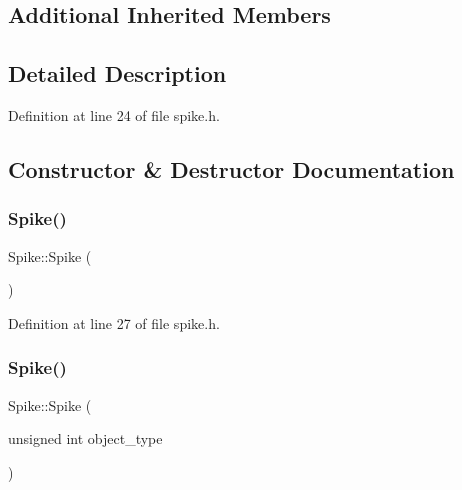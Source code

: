 \subsection*{Additional Inherited Members}


\subsection{Detailed Description}


Definition at line 24 of file spike.\+h.



\subsection{Constructor \& Destructor Documentation}
\mbox{\label{class_spike_a1f82ea9e43a3a71b878261753c722dd9}} 
\subsubsection{\texorpdfstring{Spike()}{Spike()}\hspace{0.1cm}{\footnotesize\ttfamily [1/4]}}
{\footnotesize\ttfamily Spike\+::\+Spike (\begin{DoxyParamCaption}{ }\end{DoxyParamCaption})\hspace{0.3cm}{\ttfamily [inline]}}



Definition at line 27 of file spike.\+h.

\mbox{\label{class_spike_a3e6dbba4e235f7adb02ade45c918b266}} 
\subsubsection{\texorpdfstring{Spike()}{Spike()}\hspace{0.1cm}{\footnotesize\ttfamily [2/4]}}
{\footnotesize\ttfamily Spike\+::\+Spike (\begin{DoxyParamCaption}\item[{unsigned int}]{object\+\_\+type }\end{DoxyParamCaption})\hspace{0.3cm}{\ttfamily [inline]}}



